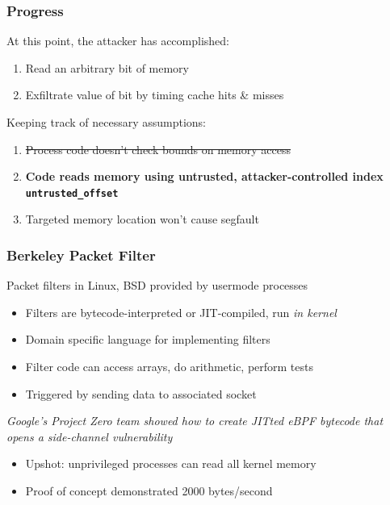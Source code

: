 \documentclass[10pt]{beamer}
\begin{document}

\begin{frame}

\frametitle{Progress}

At this point, the attacker has accomplished:
\begin{enumerate}
  \item Read an arbitrary bit of memory
  \item Exfiltrate value of bit by timing cache hits \& misses \\[1em]
\end{enumerate}

Keeping track of necessary assumptions:
\begin{enumerate}
  \item \sout{Process code doesn't check bounds on memory access}
  \item \textbf{Code reads memory using untrusted, attacker-controlled index \texttt{untrusted\_offset}}
  \item Targeted memory location won't cause segfault
\end{enumerate}

\end{frame}


\begin{frame}

\frametitle{Berkeley Packet Filter}

Packet filters in Linux, BSD provided by usermode processes \pause
\begin{itemize}
  \item Filters are bytecode-interpreted or JIT-compiled, run \emph{in kernel}
  \item Domain specific language for implementing filters
  \item Filter code can access arrays, do arithmetic, perform tests
  \item Triggered by sending data to associated socket \\[1em]
\end{itemize}

\pause
\begin{center}
\emph{Google's Project Zero team showed how to create JITted eBPF bytecode that opens a side-channel vulnerability}
\end{center}
\pause
\begin{itemize}
  \item Upshot: unprivileged processes can read all kernel memory
  \item Proof of concept demonstrated 2000 bytes/second
\end{itemize}

\end{frame}
\end{document}
